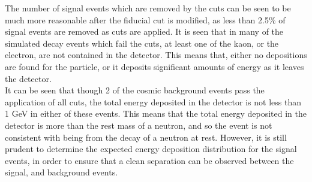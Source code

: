 The number of signal events which are removed by the cuts can be seen to be much more reasonable after the fiducial cut is modified, as less than 2.5\% of signal events are removed as cuts are applied. It is seen that in many of the simulated decay events which fail the cuts, at least one of the kaon, or the electron, are not contained in the detector. This means that, either no depositions are found for the particle, or it deposits significant amounts of energy as it leaves the detector. \\

It can be seen that though 2 of the cosmic background events pass the application of all cuts, the total energy deposited in the detector is not less than 1 GeV in either of these events. This means that the total energy deposited in the detector is more than the rest mass of a neutron, and so the event is not consistent with being from the decay of a neutron at rest. However, it is still prudent to determine the expected energy deposition distribution for the signal events, in order to ensure that a clean separation can be observed between the signal, and background events.  \\

